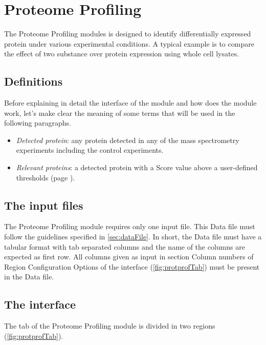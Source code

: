\chapter{Proteome Profiling}
\label{chap:protprof}

The Proteome Profiling modules is designed to identify differentially expressed
protein under various experimental conditions. A typical example is to compare the
effect of two substance over protein expression using whole cell lysates.

\section{Definitions}

Before explaining in detail the interface of the module and how does the module work, 
let's make clear the meaning of some terms that will be used in the following paragraphs.

\begin{itemize}
	\item \textit{Detected protein}: any protein detected in any of the mass spectrometry
    experiments including the control experiments.
	\item \textit{Relevant proteins}: a detected protein with a Score value above
    a user-defined thresholds (page \pageref{par:protprofScoreValue}).
\end{itemize}

\section{The input files}

The Proteome Profiling module requires only one input file. This Data file must follow
the guidelines specified in \autoref{sec:dataFile}. In short, the Data file must
have a tabular format with tab separated columns and the name of the columns are
expected as first row. All columns given as input in section Column numbers of Region
Configuration Options of the interface (\autoref{fig:protprofTab}) must be present
in the Data file.

\section{The interface}

The tab of the Proteome Profiling module is divided in two regions (\autoref{fig:protprofTab}).

